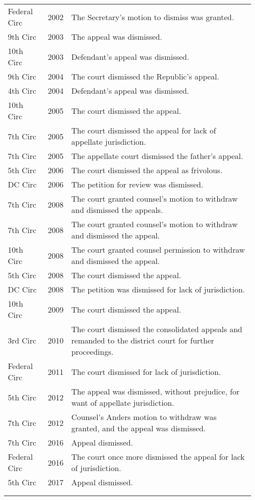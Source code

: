 \documentclass[10pt, letterpaper]{article}
\begin{document}
\begin{spacing}{1.0}
\begin{small}
\begin{longtable}[H]{llp{5in}}
    Federal Circ & 2002 & The Secretary's motion to dismiss was granted.\\[4pt]
    9th Circ & 2003 & The appeal was dismissed.\\[4pt]
    10th Circ & 2003 & Defendant's appeal was dismissed.\\[4pt]
    9th Circ & 2004 & The court dismissed the Republic's appeal.\\[4pt]
    4th Circ & 2004 & Defendant's appeal was dismissed.\\[4pt]
    10th Circ & 2005 & The court dismissed the appeal.\\[4pt]
    7th Circ & 2005 & The court dismissed the appeal for lack of appellate jurisdiction.\\[4pt]
    7th Circ & 2005 & The appellate court dismissed the father's appeal.\\[4pt]
    5th Circ & 2006 & The court dismissed the appeal as frivolous.\\[4pt]
    DC Circ & 2006 & The petition for review was dismissed.\\[4pt]
    7th Circ & 2008 & The court granted counsel's motion to withdraw and dismissed the appeals.\\[4pt]
    7th Circ & 2008 & The court granted counsel's motion to withdraw and dismissed the appeal.\\[4pt]
    10th Circ & 2008 & The court granted counsel permission to withdraw and dismissed the appeal.\\[4pt]
    5th Circ & 2008 & The court dismissed the appeal.\\[4pt]
    DC Circ & 2008 & The petition was dismissed for lack of jurisdiction.\\[4pt]
    10th Circ & 2009 & The court dismissed the appeal.\\[4pt]
    3rd Circ & 2010 & The court dismissed the consolidated appeals and remanded to the district court for further proceedings.\\[4pt]
    Federal Circ & 2011 & The court dismissed for lack of jurisdiction.\\[4pt]
    5th Circ & 2012 & The appeal was dismissed, without prejudice, for want of appellate jurisdiction.\\[4pt]
    7th Circ & 2012 & Counsel's Anders motion to withdraw was granted, and the appeal was dismissed.\\[4pt]
    7th Circ & 2016 & Appeal dismissed.\\[4pt]
    Federal Circ & 2016 & The court once more dismissed the appeal for lack of jurisdiction.\\[4pt]
    5th Circ & 2017 & Appeal dismissed.\\[4pt]
    \hline\\
    \label{tab:outcomeTextDismiss}
\end{longtable}
\end{small}


\end{spacing}
\end{document}
